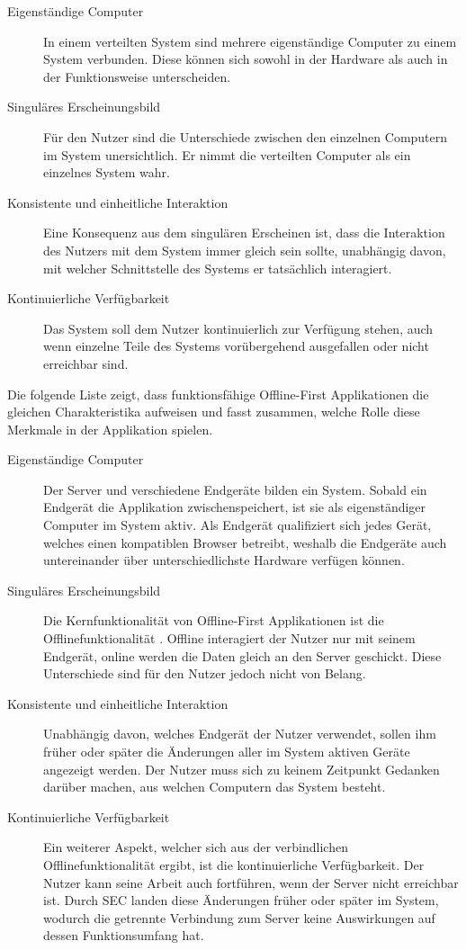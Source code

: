 \documentclass[a4paper, 12pt]{scrreprt}
\begin{document}
\begin{description}
\item[Eigenständige Computer] In einem verteilten System sind mehrere eigenständige Computer zu einem System verbunden. Diese können sich sowohl in der Hardware als auch in der Funktionsweise unterscheiden. 
\item[Singuläres Erscheinungsbild] Für den Nutzer sind die Unterschiede zwischen den einzelnen Computern im System unersichtlich. Er nimmt die verteilten Computer als ein einzelnes System wahr. 
\item[Konsistente und einheitliche Interaktion]
	Eine Konsequenz aus dem singulären Erscheinen ist, dass die Interaktion des Nutzers mit dem System immer gleich sein sollte, unabhängig davon, mit welcher Schnittstelle des Systems er tatsächlich interagiert. 
\item[Kontinuierliche Verfügbarkeit]
	Das System soll dem Nutzer kontinuierlich zur Verfügung stehen, auch wenn einzelne Teile des Systems vorübergehend ausgefallen oder nicht erreichbar sind.
\end{description}
\label{tab:charakteristikaDistributedSystem}

Die folgende Liste zeigt, dass funktionsfähige Offline-First Applikationen die gleichen Charakteristika aufweisen und fasst zusammen, welche Rolle diese Merkmale in der Applikation spielen.

\begin{description}		
\item[Eigenständige Computer] Der Server und verschiedene Endgeräte bilden ein System. Sobald ein Endgerät die Applikation zwischenspeichert, ist sie als eigenständiger Computer im System aktiv. Als Endgerät qualifiziert sich jedes Gerät, welches einen kompatiblen Browser betreibt, weshalb die Endgeräte auch untereinander über unterschiedlichste Hardware verfügen können.
\item[Singuläres Erscheinungsbild]Die Kernfunktionalität von Offline-First Applikationen ist die Offlinefunktionalität \autocite{OnlineGoogleOfflineFirst}. Offline interagiert der Nutzer nur mit seinem Endgerät, online werden die Daten gleich an den Server geschickt. Diese Unterschiede sind für den Nutzer jedoch nicht von Belang. \item[Konsistente und einheitliche Interaktion]
Unabhängig davon, welches Endgerät der Nutzer verwendet, sollen ihm früher oder später die Änderungen aller im System aktiven Geräte angezeigt werden. Der Nutzer muss sich zu keinem Zeitpunkt Gedanken darüber machen, aus welchen Computern das System besteht.
\item[Kontinuierliche Verfügbarkeit]
Ein weiterer Aspekt, welcher sich aus der verbindlichen Offlinefunktionalität ergibt, ist die kontinuierliche Verfügbarkeit. Der Nutzer kann seine Arbeit auch fortführen, wenn der Server nicht erreichbar ist. Durch SEC landen diese Änderungen früher oder später im System, wodurch die getrennte Verbindung zum Server keine Auswirkungen auf dessen Funktionsumfang hat. 
\end{description}
\label{tab:charakteristikaOfflineFirst}
\end{document}
